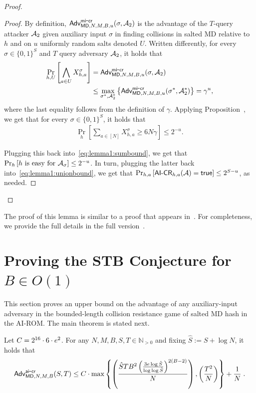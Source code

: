 {\begin{proof}
\begin{proof}
By definition,  $\mathsf{Adv}^{{\mathsf{mi}\mbox{-}\mathsf{cr}}}_{\mathsf{MD},N,M,B,u} (\sigma, \mathcal{A}_2)$ is the advantage of the $T$-query attacker $\mathcal{A}_2$ given auxiliary input $\sigma$ in finding collisions in salted MD relative to $h$ and on $u$ uniformly random salts denoted $U$. Written differently, for every $\sigma\in\{0,1\}^S$ and $T$ query adversary $\mathcal{A}_2$, it holds that 
\begin{align*}
\Pr_{h,U}\left[\bigwedge_{a\in U}X_{h,a}^\sigma\right]&= \mathsf{Adv}^{{\mathsf{mi}\mbox{-}\mathsf{cr}}}_{\mathsf{MD},N,M,B,u} (\sigma, \mathcal{A}_2) \\ 
& \le \max_{\sigma^*,\mathcal{A}_2^*} \left\{\mathsf{Adv}^{{\mathsf{mi}\mbox{-}\mathsf{cr}}}_{\mathsf{MD},N,M,B,u} (\sigma^*, \mathcal{A}^*_2) \right\}  = \gamma^u,
\end{align*}
where the last equality follows from the definition of $\gamma$.
Applying Proposition~, we get that for every $\sigma\in \{0,1\}^S$, it holds that 
\begin{align*}
\Pr_h\left[\sum_{a\in [N]}X^\sigma_{h,a}\geq 6N\gamma\right]\leq 2^{-u}.
\end{align*}

Plugging this back into~\eqref{eq:lemma1:sumbound}, we get that 
$\Pr_h\left[h\text{ is easy for } \mathcal{A}_\sigma \right] \leq 2^{-u}$. In turn, plugging the latter back into~\eqref{eq:lemma1:unionbound}, we get that $\Pr_{h,a}\left[{{\mathsf{AI}\mbox{-}\mathsf{CR}}_{h,a}(\mathcal{A})}=\mathsf{true}\right] \leq 2^{S-u}$, as needed.
\end{proof}
\end{proof}
}
\ifnum{}
\lemmaone
\else
The proof of this lemma is similar to a proof that appears in~\cite{AkshimaCDW20}. For completeness, we provide the full details in the full version~\cite{full}.
\fi
\section{Proving the STB Conjecture for $B\in O(1)$}\label{sec:comparg}
This section proves an upper bound on the advantage of any auxiliary-input adversary in the bounded-length collision resistance game of salted MD hash in the AI-ROM. The main theorem is stated next. 

\begin{theorem}\label{thm:MDST}
Let $C = {2^{16}} \cdot 6\cdot e^2$. For any $N,M,B,S,T\in \mathbb{N}_{>0}$ and fixing $\hat S := S + \log N$, it holds that 
\begin{align*}
  \mathsf{Adv}_{\mathsf{MD},N,M,B}^{{\mathsf{ai}\mbox{-}\mathsf{cr}}}(S,T) \leq C\cdot\max{\left\{\left(\frac{\hat STB^2\left(\frac{3e\log \hat S}{\log \log \hat S}\right)^{2(B-2)}}{N}\right),\left(\frac{T^2}{N}\right)\right\}}+\frac{1}{N}\;.
\end{align*}
\end{theorem}

